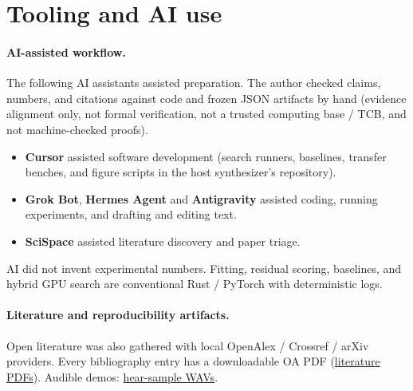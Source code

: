 \section{Tooling and AI use}
\label{sec:tooling}

\paragraph{AI-assisted workflow.}
The following AI assistants assisted preparation.
The author checked claims, numbers, and citations against code and frozen JSON artifacts by hand
(evidence alignment only, not formal verification, not a trusted computing base / TCB, and not machine-checked proofs).
\begin{itemize}
  \item \textbf{Cursor} assisted software development (search runners, baselines, transfer benches, and figure scripts in the host synthesizer's repository).
  \item \textbf{Grok Bot}, \textbf{Hermes Agent} and \textbf{Antigravity} assisted coding, running experiments, and drafting and editing text.
  \item \textbf{SciSpace} assisted literature discovery and paper triage.
\end{itemize}
AI did not invent experimental numbers.
Fitting, residual scoring, baselines, and hybrid GPU search are conventional Rust / PyTorch with deterministic logs.

\paragraph{Literature and reproducibility artifacts.}
Open literature was also gathered with local OpenAlex / Crossref / arXiv providers. Every bibliography entry has a downloadable OA PDF
(\href{https://github.com/reeldemo/denoise-opt}{literature PDFs}).
Audible demos:
\href{https://github.com/reeldemo/denoise-opt}{hear-sample WAVs}.
